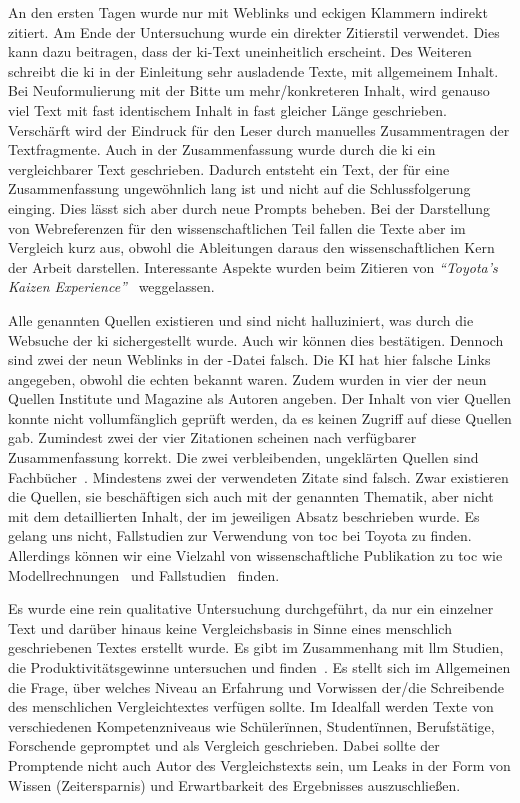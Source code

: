 An den ersten Tagen wurde nur mit Weblinks und eckigen Klammern indirekt zitiert. Am Ende der Untersuchung wurde ein direkter Zitierstil verwendet. Dies kann dazu beitragen, dass der \gls{ki}-Text uneinheitlich erscheint. Des Weiteren schreibt die \gls{ki} in der Einleitung sehr ausladende Texte, mit allgemeinem Inhalt. Bei Neuformulierung mit der Bitte um mehr/konkreteren Inhalt, wird genauso viel Text mit fast identischem Inhalt in fast gleicher Länge geschrieben. Verschärft wird der Eindruck für den Leser durch manuelles Zusammentragen der Textfragmente. 
Auch in der Zusammenfassung wurde durch die \gls{ki} ein vergleichbarer Text geschrieben. Dadurch entsteht ein Text, der für eine Zusammenfassung ungewöhnlich lang ist und nicht auf die Schlussfolgerung einging. Dies lässt sich aber durch neue Prompts beheben. Bei der Darstellung von Webreferenzen für den wissenschaftlichen Teil fallen die Texte aber im Vergleich kurz aus, obwohl die Ableitungen daraus den wissenschaftlichen Kern der Arbeit darstellen. Interessante Aspekte wurden beim Zitieren von \textit{"`Toyota's Kaizen Experience"'}~\cite{ibscmr2003toyotakaizen} weggelassen.
 
Alle genannten Quellen existieren und sind nicht halluziniert, was durch die Websuche der \gls{ki} sichergestellt wurde. Auch wir können dies bestätigen. Dennoch sind zwei der neun Weblinks in der \BibTeX{}-Datei falsch. Die KI hat hier falsche Links angegeben, obwohl die echten bekannt waren. Zudem wurden in vier der neun Quellen Institute und Magazine als Autoren angeben. Der Inhalt von vier Quellen konnte nicht vollumfänglich geprüft werden, da es keinen Zugriff auf diese Quellen gab. Zumindest zwei der vier Zitationen scheinen nach verfügbarer Zusammenfassung korrekt. Die zwei verbleibenden, ungeklärten Quellen sind Fachbücher~\cite{imai1986kaizen, womack1996lean}. Mindestens zwei der verwendeten Zitate sind falsch. Zwar existieren die Quellen, sie beschäftigen sich auch mit der genannten Thematik, aber nicht mit dem detaillierten Inhalt, der im jeweiligen Absatz beschrieben wurde. 
Es gelang uns nicht, Fallstudien zur Verwendung von \gls{toc} bei Toyota zu finden. Allerdings können wir eine Vielzahl von wissenschaftliche Publikation zu \gls{toc} wie Modellrechnungen~\cite{gundogar_dynamic_2016, thurer_bottleneck-oriented_2018} und Fallstudien~\cite{umble_implementing_2006} finden. 

Es wurde eine rein qualitative Untersuchung durchgeführt, da nur ein einzelner Text und darüber hinaus keine Vergleichsbasis in Sinne eines menschlich geschriebenen Textes erstellt wurde. Es gibt im Zusammenhang mit \gls{llm} Studien, die Produktivitätsgewinne untersuchen und finden~\cite{noy_experimental_2023}. Es stellt sich im Allgemeinen die Frage, über welches Niveau an Erfahrung und Vorwissen der/die Schreibende des menschlichen Vergleichtextes verfügen sollte. Im Idealfall werden Texte von verschiedenen Kompetenzniveaus wie Schülerïnnen, Studentïnnen, Berufstätige, Forschende gepromptet und als Vergleich geschrieben. Dabei sollte der Promptende nicht auch Autor des Vergleichstexts sein, um Leaks in der Form von Wissen (Zeitersparnis) und Erwartbarkeit des Ergebnisses auszuschließen.


